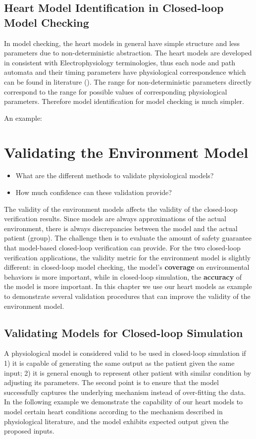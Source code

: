 \section{Heart Model Identification in Closed-loop Model Checking}
In model checking, the heart models in general have simple structure and less parameters due to non-deterministic abstraction. The heart models are developed in consistent with Electrophysiology terminologies, thus each node and path automata and their timing parameters have physiological correspondence which can be found in literature (\cite{josephson}). The range for non-deterministic parameters directly correspond to the range for possible values of corresponding physiological parameters. Therefore model identification for model checking is much simpler. 

An example: 







\chapter{Validating the Environment Model}
\begin{itemize}
	\item What are the different methods to validate physiological models?
    \item How much confidence can these validation provide?
\end{itemize}
The validity of the environment models affects the validity of the closed-loop verification results. Since models are always approximations of the actual environment, there is always discrepancies between the model and the actual patient (group). The challenge then is to evaluate the amount of safety guarantee that model-based closed-loop verification can provide. For the two closed-loop verification applications, the validity metric for the environment model is slightly different: in closed-loop model checking, the model's \textbf{coverage} on environmental behaviors is more important, while in closed-loop simulation, the \textbf{accuracy} of the model is more important. In this chapter we use our heart models as example to demonstrate several validation procedures that can improve the validity of the environment model.

\section{Validating Models for Closed-loop Simulation}
A physiological model is considered valid to be used in closed-loop simulation if 1) it is capable of generating the same output as the patient given the same input; 2) it is general enough to represent other patient with similar condition by adjusting its parameters. The second point is to ensure that the model successfully captures the underlying mechanism instead of over-fitting the data. In the following example we demonstrate the capability of our heart models to model certain heart conditions according to the mechanism described in physiological literature, and the model exhibits expected output given the proposed inputs.

